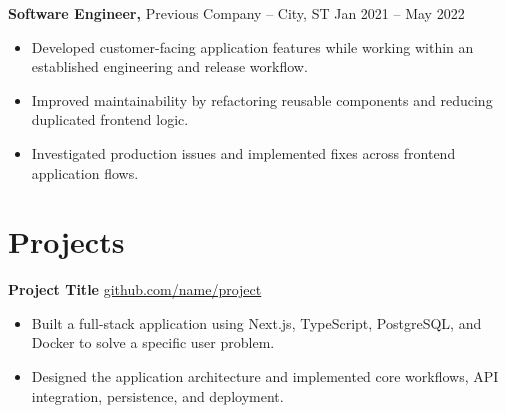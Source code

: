 \documentclass[11pt]{article}
\begin{document}
\textbf{Software Engineer,} {Previous Company} -- City, ST
\hfill Jan 2021 -- May 2022 \\

\vspace{-9pt}

\begin{itemize}
  \item Developed customer-facing application features while working within an established engineering and release workflow.
  \item Improved maintainability by refactoring reusable components and reducing duplicated frontend logic.
  \item Investigated production issues and implemented fixes across frontend application flows.
\end{itemize}

\vspace{-18.5pt}

%
%
%
%
\section*{Projects}

\textbf{Project Title}
\hfill
\href{https://github.com/name/project}{github.com/name/project} \\

\vspace{-9pt}

\begin{itemize}
  \item Built a full-stack application using Next.js, TypeScript, PostgreSQL, and Docker to solve a specific user problem.
  \item Designed the application architecture and implemented core workflows, API integration, persistence, and deployment.
\end{itemize}
\end{document}
